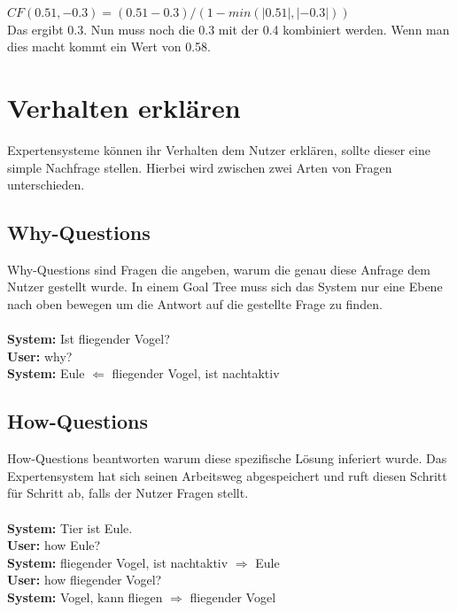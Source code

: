 $CF \left( 0.51,-0.3 \right) =\left( 0.51-0.3 \right) / \left(1-min \left(|0.51|, |-0.3|\right) \right)$ \\
Das ergibt 0.3. 
Nun muss noch die 0.3 mit der 0.4 kombiniert werden. Wenn man dies macht kommt ein Wert von 0.58.



\section{Verhalten erklären}
\noindent Expertensysteme können ihr Verhalten dem Nutzer erklären, sollte dieser eine simple Nachfrage stellen. Hierbei wird zwischen zwei Arten von Fragen unterschieden.

\subsection{Why-Questions}
\noindent Why-Questions sind Fragen die angeben, warum die genau diese Anfrage dem Nutzer gestellt wurde. In einem Goal Tree muss sich das System nur eine Ebene nach oben bewegen um die Antwort auf die gestellte Frage zu finden.\\

\\
\noindent \textbf{System:} Ist fliegender Vogel?\\
\textbf{User:} why?\\
\textbf{System:} Eule $\Leftarrow$ fliegender Vogel, ist nachtaktiv

\subsection{How-Questions}
\noindent How-Questions beantworten warum diese spezifische Lösung inferiert wurde. Das Expertensystem hat sich seinen Arbeitsweg abgespeichert und ruft diesen Schritt für Schritt ab, falls der Nutzer Fragen stellt.\\

\\
\noindent \textbf{System:} Tier ist Eule.\\
\textbf{User:} how Eule?\\
\textbf{System:} fliegender Vogel, ist nachtaktiv $\Rightarrow$ Eule\\
\textbf{User:} how fliegender Vogel?\\
\textbf{System:} Vogel, kann fliegen $\Rightarrow$ fliegender Vogel


